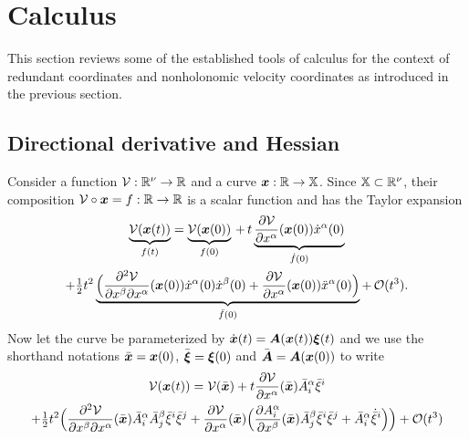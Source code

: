 \section{Calculus}
This section reviews some of the established tools of calculus for the context of redundant coordinates and nonholonomic velocity coordinates as introduced in the previous section.

\subsection{Directional derivative and Hessian}
Consider a function $\potentialEnergy : \RealNum^{\numCoord} \rightarrow \RealNum$ and a curve $\sysCoord : \RealNum \rightarrow \configSpace$.
Since $\configSpace \subset \RealNum^{\numCoord}$, their composition $\potentialEnergy \circ \sysCoord = f : \RealNum \rightarrow \RealNum$ is a scalar function and has the Taylor expansion
\begin{multline}
 \underbrace{\potentialEnergy(\sysCoord(t))}_{f(t)}
 = \underbrace{\potentialEnergy(\sysCoord(0))}_{f(0)}
  \, + \, t \underbrace{\pdiff[\potentialEnergy]{\sysCoordCoeff{\GidxI}}(\sysCoord(0)) \sysCoordCoeffd{\GidxI}(0)}_{\dot{f}(0)}
 \\
  + \tfrac{1}{2} t^2 \underbrace{\Big( \frac{\partial^2 \potentialEnergy}{\partial\sysCoordCoeff{\GidxII} \partial\sysCoordCoeff{\GidxI}}(\sysCoord(0)) \sysCoordCoeffd{\GidxI}(0) \sysCoordCoeffd{\GidxII}(0) + \pdiff[\potentialEnergy]{\sysCoordCoeff{\GidxI}}(\sysCoord(0)) \sysCoordCoeffdd{\GidxI}(0)\Big)}_{\ddot{f}(0)}
  + \, \mathcal{O}(t^3).
\end{multline}
Now let the curve be parameterized by $\sysCoordd(t) = \kinMat(\sysCoord(t))\sysVel(t)$ and we use the shorthand notations $\sysCoordB = \sysCoord(0)$, $\sysVelB = \sysVel(0)$ and $\kinMatB = \kinMat(\sysCoord(0))$ to write
\begin{multline}
 \potentialEnergy(\sysCoord(t))
 = \potentialEnergy(\sysCoordB)
  + t \pdiff[\potentialEnergy]{\sysCoordCoeff{\GidxI}}(\sysCoordB) \kinMatCoeffB{\GidxI}{\LidxI} \sysVelCoeffB{\LidxI}
\\
  + \tfrac{1}{2} t^2 \Big( \frac{\partial^2 \potentialEnergy}{\partial\sysCoordCoeff{\GidxII} \partial\sysCoordCoeff{\GidxI}}(\sysCoordB) \kinMatCoeffB{\GidxI}{\LidxI} \kinMatCoeffB{\GidxII}{\LidxII} \sysVelCoeffB{\LidxI} \sysVelCoeffB{\LidxII} + \pdiff[\potentialEnergy]{\sysCoordCoeff{\GidxI}}(\sysCoordB) \Big( \pdiff[\kinMatCoeff{\GidxI}{\LidxI}]{\sysCoordCoeff{\GidxII}}(\sysCoordB) \kinMatCoeffB{\GidxII}{\LidxII} \sysVelCoeffB{\LidxI}\sysVelCoeffB{\LidxII} + \kinMatCoeffB{\GidxI}{\LidxI} \sysVelCoeffBd{\LidxI}\Big) \Big)
  + \mathcal{O}(t^3)
\end{multline}
